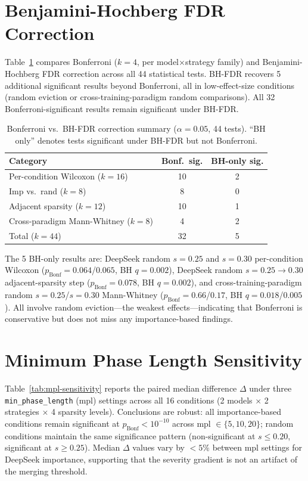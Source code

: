 \section{Benjamini-Hochberg FDR Correction}
\label{app:bh-fdr}

Table~\ref{tab:bh-fdr} compares Bonferroni ($k{=}4$, per model$\times$strategy family) and Benjamini-Hochberg FDR correction across all 44 statistical tests. BH-FDR recovers 5 additional significant results beyond Bonferroni, all in low-effect-size conditions (random eviction or cross-training-paradigm random comparisons). All 32 Bonferroni-significant results remain significant under BH-FDR.

\begin{table}[t]
\centering
\small
\caption{Bonferroni vs.\ BH-FDR correction summary ($\alpha{=}0.05$, 44 tests). ``BH only'' denotes tests significant under BH-FDR but not Bonferroni.}
\label{tab:bh-fdr}
\begin{tabular}{@{}lcc@{}}
\toprule
Category & Bonf.\ sig. & BH-only sig. \\
\midrule
Per-condition Wilcoxon ($k{=}16$) & 10 & 2 \\
Imp vs.\ rand ($k{=}8$) & 8 & 0 \\
Adjacent sparsity ($k{=}12$) & 10 & 1 \\
Cross-paradigm Mann-Whitney ($k{=}8$) & 4 & 2 \\
\midrule
Total ($k{=}44$) & 32 & 5 \\
\bottomrule
\end{tabular}
\end{table}

The 5 BH-only results are: DeepSeek random $s{=}0.25$ and $s{=}0.30$ per-condition Wilcoxon ($p_{\text{Bonf}}{=}0.064$/$0.065$, BH $q{=}0.002$), DeepSeek random $s{=}0.25 \to 0.30$ adjacent-sparsity step ($p_{\text{Bonf}}{=}0.078$, BH $q{=}0.002$), and cross-training-paradigm random $s{=}0.25$/$s{=}0.30$ Mann-Whitney ($p_{\text{Bonf}}{=}0.66$/$0.17$, BH $q{=}0.018$/$0.005$). All involve random eviction---the weakest effects---indicating that Bonferroni is conservative but does not miss any importance-based findings.


\section{Minimum Phase Length Sensitivity}
\label{app:mpl-sensitivity}

Table~\ref{tab:mpl-sensitivity} reports the paired median difference $\Delta$ under three \texttt{min\_phase\_length} (mpl) settings across all 16 conditions (2 models $\times$ 2 strategies $\times$ 4 sparsity levels). Conclusions are robust: all importance-based conditions remain significant at $p_{\text{Bonf}} < 10^{-10}$ across mpl $\in \{5, 10, 20\}$; random conditions maintain the same significance pattern (non-significant at $s \leq 0.20$, significant at $s \geq 0.25$). Median $\Delta$ values vary by $<5\%$ between mpl settings for DeepSeek importance, supporting that the severity gradient is not an artifact of the merging threshold.

